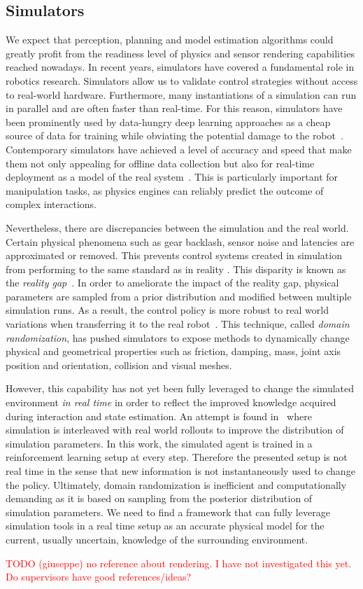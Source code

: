 \subsection{Simulators}
We expect that perception, planning and model estimation algorithms could greatly profit from the readiness level of physics and sensor rendering capabilities reached nowadays.  
In recent years, simulators have covered a fundamental role in robotics research. Simulators allow us to validate control strategies without access to real-world hardware. Furthermore, many instantiations of a simulation can run in parallel and are often faster than real-time.  For this reason, simulators have been prominently used by data-hungry deep learning approaches as a cheap source of data for training while obviating the potential damage to the robot~\cite{liang_gpu-accelerated_2018}.
Contemporary simulators have achieved a level of accuracy and speed that make them not only appealing for offline data collection but also for real-time deployment as a model of the real system~\cite{sim-benchmarks}. This is particularly important for manipulation tasks, as physics engines can reliably predict the outcome of complex interactions.  

Nevertheless, there are discrepancies between the simulation and the real world. Certain physical phenomena such as gear backlash, sensor noise and latencies are approximated or removed. This prevents control systems created in simulation from performing to the same standard as in reality \cite{collins_benchmarking_2020}. This disparity is known as the \emph{reality gap}~\cite{hofer2021sim2real}. In order to ameliorate the impact of the reality gap, physical parameters are sampled from a prior distribution and modified between multiple simulation runs. As a result, the control policy is more robust to real world variations when transferring it to the real robot~\cite{andrychowicz2020learning}. This technique, called \emph{domain randomization}, has pushed simulators to expose methods to dynamically change physical and geometrical properties such as friction, damping, mass, joint axis position and orientation, collision and visual meshes.

However, this capability has not yet been fully leveraged to change the simulated environment \emph{in real time} in order to reflect the improved knowledge acquired during interaction and state estimation. An attempt is found in~\cite{chebotar2019closing} where simulation is interleaved with real world rollouts to improve the distribution of simulation parameters. In this work, the simulated agent is trained in a reinforcement learning setup at every step. Therefore the presented setup is not real time in the sense that new information is not instantaneously used to change the policy. Ultimately, domain randomization is inefficient and computationally demanding as it is based on sampling from the posterior distribution of simulation parameters. We need to find a framework that can fully leverage simulation tools in a real time setup as an accurate physical model for the current, usually uncertain, knowledge of the surrounding environment.

\textcolor{red}{TODO (giuseppe) no reference about rendering. I have not investigated this yet. Do supervisors have good references/ideas?}
